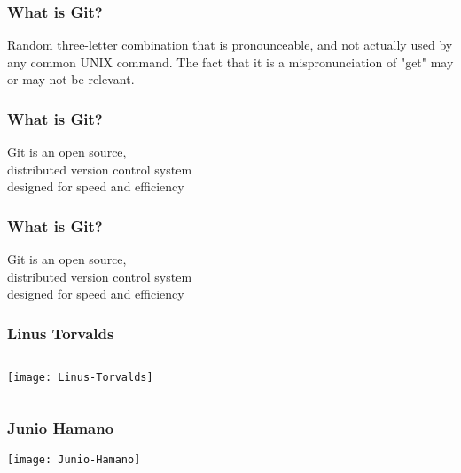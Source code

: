 \begin{frame}
    \frametitle{What is Git?}
    Random three-letter combination that is pronounceable, and not actually
    used by any common UNIX command. The fact that it is a mispronunciation of
    "get" may or may not be relevant.
\end{frame}

\begin{frame}
    \frametitle{What is Git?}
    \centering
    Git is an open source,\\
    distributed version control system\\
    designed for speed and efficiency
\end{frame}

\begin{frame}
    \frametitle{What is Git?}
    \centering
    Git is an \alert{open source},\\
    distributed version control system\\
    designed for speed and efficiency
\end{frame}

\begin{frame}
    \frametitle{Linus Torvalds}
    \begin{columns}
        \begin{column}{0.38\textwidth}
            \texttt{[image: Linus-Torvalds]}
        \end{column}
        \begin{column}{0.62\textwidth}
        \end{column}
    \end{columns}
\end{frame}

\begin{frame}
    \frametitle{Junio Hamano}
    \centering
    \texttt{[image: Junio-Hamano]}
\end{frame}

